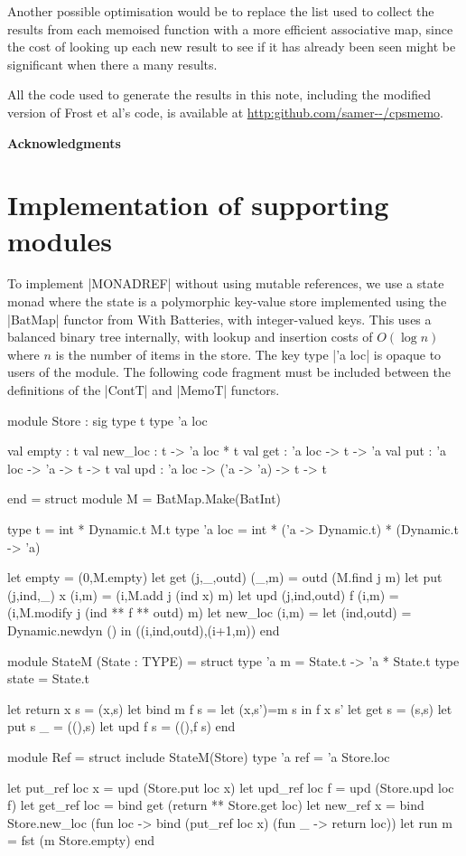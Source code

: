Another possible optimisation would be to replace the list used to collect the
results from each memoised function with a more efficient associative
map, since the cost of looking up 
each new result to see if it has already been seen might be significant when
there a many results.

All the code used to generate the results in this note, including the modified
version of Frost et al's code, is available at \url{http:github.com/samer--/cpsmemo}.

\bigskip
\noindent
\textbf{Acknowledgments}\\
\TheAcknowledgments

\appendix
\section{Implementation of supporting modules}
To implement |MONADREF| without using \OCaml mutable references,
we use a state monad where the state is a polymorphic key-value store implemented
using the |BatMap| functor from \OCaml With Batteries, with integer-valued keys.
This uses a balanced binary tree internally, with
lookup and insertion costs of $O(\log n)$ where $n$ is the number of items
in the store. The key type |'a loc| is opaque to users of the module.
The following code fragment must be included between the definitions of the
|ContT| and |MemoT| functors.
\begin{ocaml}
	module Store : sig
		type t
		type 'a loc

		val empty : t
		val new_loc : t -> 'a loc * t
		val get : 'a loc -> t -> 'a 
		val put : 'a loc -> 'a -> t -> t
		val upd : 'a loc -> ('a -> 'a) -> t -> t

	end = struct
		module M = BatMap.Make(BatInt)

		type t =  int * Dynamic.t M.t
		type 'a loc = int * ('a -> Dynamic.t) * (Dynamic.t -> 'a)

		let empty = (0,M.empty)
		let get (j,_,outd) (_,m)     = outd (M.find j m) 
		let put (j,ind,_) x (i,m)    = (i,M.add j (ind x) m)
		let upd (j,ind,outd) f (i,m) = (i,M.modify j (ind ** f ** outd) m)
		let new_loc (i,m) = let (ind,outd) = Dynamic.newdyn () in 
                        ((i,ind,outd),(i+1,m))
	end

	module StateM (State : TYPE) = struct
		type 'a m = State.t -> 'a * State.t 
		type state = State.t

		let return x s = (x,s)
		let bind m f s = let (x,s')=m s in f x s'
		let get s   = (s,s)
		let put s _ = ((),s)
		let upd f s = ((),f s)
	end

	module Ref = struct
		include StateM(Store)
		type 'a ref = 'a Store.loc

		let put_ref loc x  = upd (Store.put loc x)
		let upd_ref loc f  = upd (Store.upd loc f)
		let get_ref loc    = bind get (return ** Store.get loc)
		let new_ref x = bind Store.new_loc (fun loc ->
										bind (put_ref loc x) (fun _ -> return loc))
		let run m = fst (m Store.empty)
	end
\end{ocaml}
